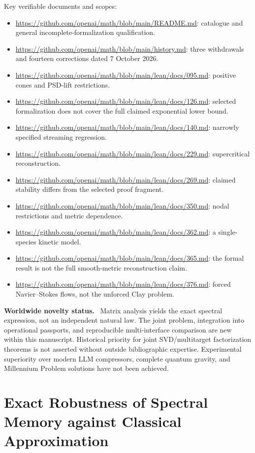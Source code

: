 \documentclass[11pt,a4paper,oneside]{book}
\newcommand{\note}[1]{\par\medskip\noindent\textbf{#1}\ }
\begin{document}
Key verifiable documents and scopes:
\begin{itemize}
\item \url{https://github.com/openai/math/blob/main/README.md}: catalogue and general incomplete-formalization qualification.
\item \url{https://github.com/openai/math/blob/main/history.md}: three withdrawals and fourteen corrections dated 7 October 2026.
\item \url{https://github.com/openai/math/blob/main/lean/docs/095.md}: positive cones and PSD-lift restrictions.
\item \url{https://github.com/openai/math/blob/main/lean/docs/126.md}: selected formalization does not cover the full claimed exponential lower bound.
\item \url{https://github.com/openai/math/blob/main/lean/docs/140.md}: narrowly specified streaming regression.
\item \url{https://github.com/openai/math/blob/main/lean/docs/229.md}: supercritical reconstruction.
\item \url{https://github.com/openai/math/blob/main/lean/docs/269.md}: claimed stability differs from the selected proof fragment.
\item \url{https://github.com/openai/math/blob/main/lean/docs/350.md}: nodal restrictions and metric dependence.
\item \url{https://github.com/openai/math/blob/main/lean/docs/362.md}: a single-species kinetic model.
\item \url{https://github.com/openai/math/blob/main/lean/docs/365.md}: the formal result is not the full smooth-metric reconstruction claim.
\item \url{https://github.com/openai/math/blob/main/lean/docs/376.md}: forced Navier--Stokes flows, not the unforced Clay problem.
\end{itemize}
\note{Worldwide novelty status.} Matrix analysis yields the exact spectral expression, not an independent natural law. The joint problem, integration into operational passports, and reproducible multi-interface comparison are new within this manuscript. Historical priority for joint SVD/multitarget factorization theorems is not asserted without outside bibliographic expertise. Experimental superiority over modern LLM compressors, complete quantum gravity, and Millennium Problem solutions have not been achieved.
\chapter{Exact Robustness of Spectral Memory against Classical Approximation}
\end{document}
